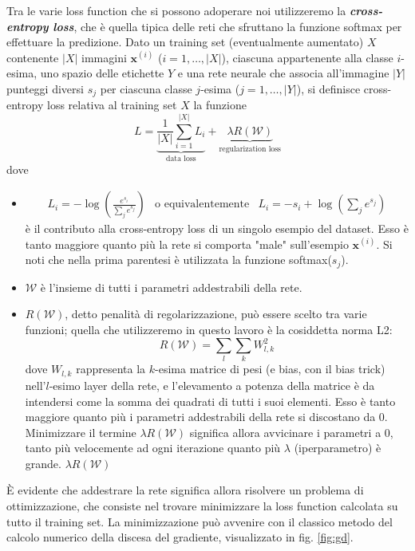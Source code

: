 Tra le varie loss function che si possono adoperare noi utilizzeremo la \textbf{\textit{cross-entropy loss}}, che è quella tipica delle reti che sfruttano la funzione softmax per effettuare la predizione.
Dato un training set (eventualmente aumentato) $X$ contenente $|X|$ immagini $\mathbf{x}^{(i)}$ ($i=1,\dots,|X|$), ciascuna appartenente alla classe $i$-esima, uno spazio delle etichette $Y$ e una rete neurale che associa all'immagine $|Y|$ punteggi diversi $s_j$ per ciascuna classe $j$-esima ($j=1,\dots,|Y|$), si definisce cross-entropy loss relativa al training set $X$ la funzione
\[
L=\underbrace{\frac{1}{|X|}\sum_{i=1}^{|X|}L_i}_{\text{data loss}}+\underbrace{\lambda R(\mathcal{W})}_{\text{regularization loss}}
\]
dove
\begin{itemize}
\item \begin{align*}
L_i=-\log\left(\frac{e^{s_i}}{\sum\nolimits_{j}e^{s_j}}\right) & \text{o equivalentemente} & L_i=-s_i+\log\left(\sum\nolimits_{j}e^{s_j}\right)
\end{align*}
è il contributo alla cross-entropy loss di un singolo esempio del dataset. Esso è tanto maggiore quanto più la rete si comporta "male" sull'esempio $\mathbf{x}^{(i)}$. Si noti che nella prima parentesi è utilizzata la funzione softmax($s_j$).

\item $\mathcal{W}$ è l'insieme di tutti i parametri addestrabili della rete.

\item $R(\mathcal{W})$, detto penalità di regolarizzazione, può essere scelto tra varie funzioni; quella che utilizzeremo in questo lavoro è la cosiddetta norma L2:
\[
R(\mathcal{W}) = \sum_l\sum_k W_{l,k}^2
\]
dove $W_{l,k}$ rappresenta la $k$-esima matrice di pesi (e bias, con il bias trick) nell'$l$-esimo layer della rete, e l'elevamento a potenza della matrice è da intendersi come la somma dei quadrati di tutti i suoi elementi. Esso è tanto maggiore quanto più i parametri addestrabili della rete si discostano da 0. Minimizzare il termine $\lambda R(\mathcal{W})$ significa allora avvicinare i parametri a 0, tanto più velocemente ad ogni iterazione quanto più $\lambda$ (iperparametro) è grande.
$\lambda R(\mathcal{W})$

\end{itemize}

È evidente che addestrare la rete significa allora risolvere un problema di ottimizzazione, che consiste nel trovare minimizzare la loss function calcolata su tutto il training set. La minimizzazione può avvenire con il classico metodo del calcolo numerico della discesa del gradiente, visualizzato in fig. \ref{fig:gd}.

